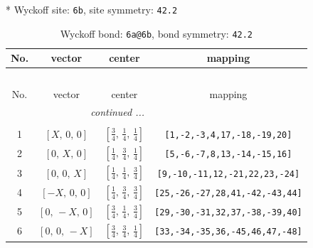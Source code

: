 \documentclass[fleqn,8pt]{jsarticle}
\begin{document}
* Wyckoff site: {\tt 6b}, site symmetry: {\tt 42.2}
\renewcommand{\arraystretch}{1.2}
\begin{longtable}{cccc}
\caption{Wyckoff bond: {\tt 6a@6b}, bond symmetry: {\tt 42.2}}
 \\
 \hline \hline
No. & vector & center & mapping \\ \hline \endfirsthead

\multicolumn{3}{l}{\tablename\ \thetable{}} \\
 \hline \hline
No. & vector & center & mapping \\ \hline \endhead

 \hline \hline
\multicolumn{3}{r}{\footnotesize\it continued ...} \\ \endfoot

 \hline \hline
\multicolumn{3}{r}{} \\ \endlastfoot

1 & $\left[ X,\, 0,\, 0 \right]$ & $\left[ \frac{3}{4},\, \frac{1}{4},\, \frac{1}{4} \right]$ & {\tt [1,-2,-3,4,17,-18,-19,20]} \\ \hline
2 & $\left[ 0,\, X,\, 0 \right]$ & $\left[ \frac{1}{4},\, \frac{3}{4},\, \frac{1}{4} \right]$ & {\tt [5,-6,-7,8,13,-14,-15,16]} \\ \hline
3 & $\left[ 0,\, 0,\, X \right]$ & $\left[ \frac{1}{4},\, \frac{1}{4},\, \frac{3}{4} \right]$ & {\tt [9,-10,-11,12,-21,22,23,-24]} \\ \hline
4 & $\left[ - X,\, 0,\, 0 \right]$ & $\left[ \frac{1}{4},\, \frac{3}{4},\, \frac{3}{4} \right]$ & {\tt [25,-26,-27,28,41,-42,-43,44]} \\ \hline
5 & $\left[ 0,\, - X,\, 0 \right]$ & $\left[ \frac{3}{4},\, \frac{1}{4},\, \frac{3}{4} \right]$ & {\tt [29,-30,-31,32,37,-38,-39,40]} \\ \hline
6 & $\left[ 0,\, 0,\, - X \right]$ & $\left[ \frac{3}{4},\, \frac{3}{4},\, \frac{1}{4} \right]$ & {\tt [33,-34,-35,36,-45,46,47,-48]} \\
\end{longtable}
\renewcommand{\arraystretch}{1.2}
\end{document}
